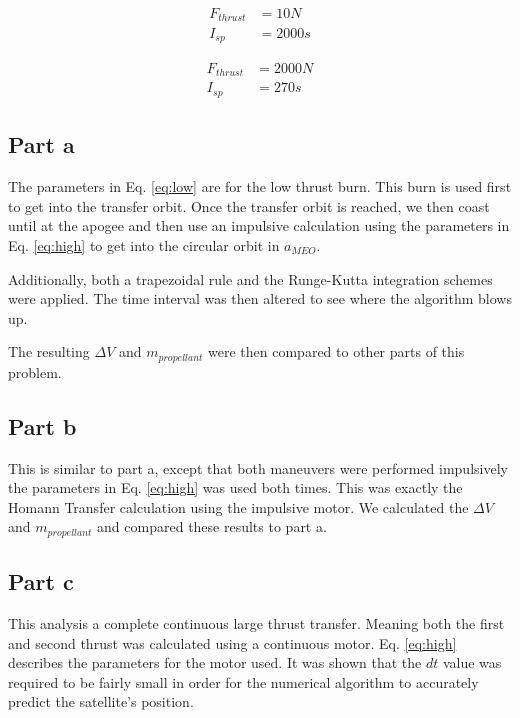 \documentclass[cleanfoot,cleanhead,onecolumn,10pt,notitlepage]{asme2e}
\begin{document}
\begin{equation}
\begin{aligned}
F_{thrust} &= 10 N \\
I_{sp} &= 2000 s
\label{eq:low}
\end{aligned}
\end{equation}

\begin{equation}
\begin{aligned}
F_{thrust} &= 2000 N \\
I_{sp} &= 270 s
\label{eq:high}
\end{aligned}
\end{equation}

\subsection{Part a}

The parameters in Eq. \ref{eq:low} are for the low thrust burn.  This burn is used first to get into the transfer orbit.  Once the transfer orbit is reached, we then coast until at the apogee and then use an impulsive calculation using the parameters in Eq. \ref{eq:high} to get into the circular orbit in $a_{MEO}$.  

Additionally, both a trapezoidal rule and the Runge-Kutta integration schemes were applied.  The time interval was then altered to see where the algorithm blows up.

The resulting $\Delta V$ and $m_{propellant}$ were then compared to other parts of this problem.

\subsection{Part b}

This is similar to part a, except that both maneuvers were performed impulsively the parameters in Eq. \ref{eq:high} was used both times.  This was exactly the Homann Transfer calculation using the impulsive motor.  We calculated the $\Delta V$ and $m_{propellant}$ and compared these results to part a.


\subsection{Part c}

This analysis a complete continuous large thrust transfer.  Meaning both the first and second thrust was calculated using a continuous motor.  Eq. \ref{eq:high} describes the parameters for the motor used.  It was shown that the $dt$ value was required to be fairly small in order for the numerical algorithm to accurately predict the satellite's position.
\end{document}
